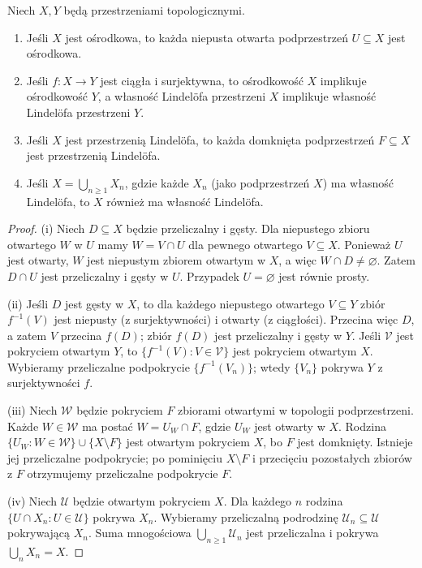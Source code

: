 \begin{twierdzenie}
\label{thm:topog-osrodk-lindelof-zachowanie}
Niech $X,Y$ będą przestrzeniami topologicznymi.
\begin{enumerate}[label=(\roman*)]
\item Jeśli $X$ jest ośrodkowa, to każda niepusta otwarta
podprzestrzeń $U\subseteq X$ jest ośrodkowa.
\item Jeśli $f:X\to Y$ jest ciągła i surjektywna, to
ośrodkowość $X$ implikuje ośrodkowość $Y$, a własność
Lindelöfa przestrzeni $X$ implikuje własność Lindelöfa
przestrzeni $Y$.
\item Jeśli $X$ jest przestrzenią Lindelöfa,
to każda domknięta podprzestrzeń $F\subseteq X$ jest
przestrzenią Lindelöfa.
\item Jeśli $X=\bigcup_{n\geq1}X_n$, gdzie każde $X_n$
(jako podprzestrzeń $X$) ma własność Lindelöfa,
to $X$ również ma własność Lindelöfa.
\end{enumerate}
\end{twierdzenie}
\begin{proof}
(i) Niech $D\subseteq X$ będzie przeliczalny i gęsty.
Dla niepustego zbioru otwartego $W$ w $U$ mamy
$W=V\cap U$ dla pewnego otwartego $V\subseteq X$.
Ponieważ $U$ jest otwarty, $W$ jest niepustym zbiorem
otwartym w $X$, a więc $W\cap D\ne\varnothing$.
Zatem $D\cap U$ jest przeliczalny i gęsty w $U$.
Przypadek $U=\varnothing$ jest równie prosty.

(ii) Jeśli $D$ jest gęsty w $X$, to dla każdego niepustego
otwartego $V\subseteq Y$ zbiór $f^{-1}(V)$ jest niepusty
(z surjektywności) i otwarty (z ciągłości). Przecina więc $D$,
a zatem $V$ przecina $f(D)$; zbiór $f(D)$ jest
przeliczalny i gęsty w $Y$. Jeśli $\mathcal V$ jest
pokryciem otwartym $Y$, to
$\{f^{-1}(V):V\in\mathcal V\}$ jest pokryciem otwartym
$X$. Wybieramy przeliczalne podpokrycie
$\{f^{-1}(V_n)\}$; wtedy $\{V_n\}$ pokrywa $Y$
z surjektywności $f$.

(iii) Niech $\mathcal W$ będzie pokryciem $F$ zbiorami
otwartymi w topologii podprzestrzeni. Każde $W\in\mathcal W$
ma postać $W=U_W\cap F$, gdzie $U_W$ jest otwarty w $X$.
Rodzina $\{U_W:W\in\mathcal W\}\cup\{X\setminus F\}$
jest otwartym pokryciem $X$, bo $F$ jest domknięty.
Istnieje jej przeliczalne podpokrycie; po pominięciu
$X\setminus F$ i przecięciu pozostałych zbiorów z $F$
otrzymujemy przeliczalne podpokrycie $F$.

(iv) Niech $\mathcal U$ będzie otwartym pokryciem $X$.
Dla każdego $n$ rodzina
$\{U\cap X_n:U\in\mathcal U\}$ pokrywa $X_n$.
Wybieramy przeliczalną podrodzinę $\mathcal U_n\subseteq\mathcal U$
pokrywającą $X_n$. Suma mnogościowa
$\bigcup_{n\geq1}\mathcal U_n$ jest przeliczalna
i pokrywa $\bigcup_nX_n=X$.
\end{proof}

